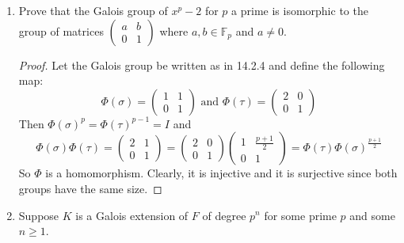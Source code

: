\documentclass{report}
\newcommand{\F}{\mathbb{F}}
\begin{document}
\begin{enumerate}
\begin{proof}
			Any automorphism will defined by its action on the two generators of the splitting field, and so can be contstructed by compositions of the following two automorphisms:
			$$\sigma:\begin{cases} \sqrt[p]{2}\zeta_p^i&\mapsto\sqrt[p]{2}\zeta_p^{i+1} \\ \zeta_p &\mapsto \zeta_p\end{cases}\text{ and }
			\tau:\begin{cases}\sqrt[p]{2} &\mapsto\sqrt[p]{2} \\ \zeta_p^i &\mapsto \zeta_p^{2i}\end{cases}$$
			Where multiplication and addition are mod $p$. Note that $\sigma\tau=\tau\sigma^{\frac{p+1}{2}}$, so we have the following presentation of the Galois group:
			$$\langle\sigma,\tau|\sigma^p=\tau^{p-1}=1,\sigma\tau=\tau\sigma^{\frac{p+1}{2}}\rangle.$$
		\end{proof}
	\item Prove that the Galois group of $x^p-2$ for $p$ a prime is isomorphic to the group of matrices $\begin{pmatrix}a&b\\0&1\end{pmatrix}$ where $a,b\in\F_p$ and $a\neq 0$.
		\begin{proof}
			Let the Galois group be written as in 14.2.4 and define the following map:
			$$\Phi(\sigma)=\begin{pmatrix}1&1\\0&1\end{pmatrix}\text{ and }\Phi(\tau)=\begin{pmatrix}2&0\\0&1\end{pmatrix}$$
			Then $\Phi(\sigma)^p=\Phi(\tau)^{p-1}=I$ and 
			$$\Phi(\sigma)\Phi(\tau)=\begin{pmatrix}2&1\\0&1\end{pmatrix}=\begin{pmatrix}2&0\\0&1\end{pmatrix}
			\begin{pmatrix}1&\frac{p+1}{2}\\0&1\end{pmatrix}=\Phi(\tau)\Phi(\sigma)^{\frac{p+1}{2}}$$
			So $\Phi$ is a homomorphism. Clearly, it is injective and it is surjective since both groups have the same size.
		\end{proof}
		\setcounter{enumi}{7}
	\item Suppose $K$ is a Galois extension of $F$ of degree $p^n$ for some prime $p$ and some $n\geq 1$.

\end{enumerate}
\end{document}
